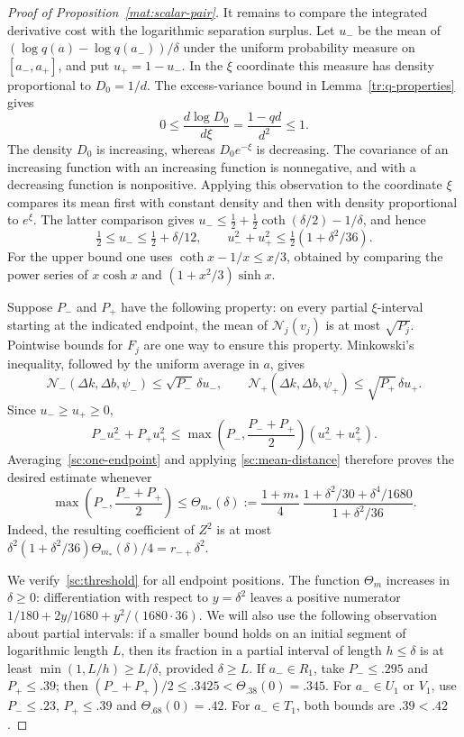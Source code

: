 \begin{proof}[Proof of Proposition~\ref{mat:scalar-pair}]
It remains to compare the integrated derivative cost with the logarithmic
separation surplus.  Let $u_-$ be the mean of
$(\log q(a)-\log q(a_-))/\delta$ under the uniform probability measure
on $[a_-,a_+]$, and put $u_+=1-u_-$.  In the $\xi$ coordinate this measure
has density proportional to $D_0=1/d$.  The excess-variance bound in
Lemma~\ref{tr:q-properties} gives
\[
 0\le \frac{d\log D_0}{d\xi}=\frac{1-qd}{d^2}\le1.
\]
The density $D_0$ is increasing, whereas $D_0e^{-\xi}$ is decreasing.
The covariance of an increasing function with an increasing function is
nonnegative, and with a decreasing function is nonpositive. Applying this
observation to the coordinate $\xi$ compares its mean first with constant
density and then with density proportional to $e^\xi$. The latter comparison
gives
$u_-\le\tfrac12+\tfrac12\coth(\delta/2)-1/\delta$, and hence
\begin{equation}\label{sc:mean-distance}
 \tfrac12\le u_-\le\tfrac12+\delta/12,
 \qquad u_-^2+u_+^2\le\tfrac12(1+\delta^2/36).
\end{equation}
For the upper bound one uses $\coth x-1/x\le x/3$, obtained by comparing
the power series of $x\cosh x$ and $(1+x^2/3)\sinh x$.

Suppose $P_-$ and $P_+$ have the following property: on every partial
$\xi$-interval starting at the indicated endpoint, the mean of
$\mathcal N_j(v_j)$ is at most $\sqrt{P_j}$.  Pointwise bounds for $F_j$
are one way to ensure this property.  Minkowski's inequality, followed by
the uniform average in $a$, gives
\[
 \mathcal N_-(\Delta k,\Delta b,\psi_-)\le\sqrt{P_-}\,\delta u_-,
 \qquad
 \mathcal N_+(\Delta k,\Delta b,\psi_+)\le\sqrt{P_+}\,\delta u_+.
\]
Since $u_-\ge u_+\ge0$,
\[
 P_-u_-^2+P_+u_+^2
 \le\max\left(P_-,\frac{P_-+P_+}{2}\right)(u_-^2+u_+^2).
\]
Averaging~\eqref{sc:one-endpoint} and applying
\eqref{sc:mean-distance} therefore proves the desired estimate whenever
\begin{equation}\label{sc:threshold}
 \max\left(P_-,\frac{P_-+P_+}{2}\right)\le
 \Theta_{m_*}(\delta):=
 \frac{1+m_*}{4}\,
 \frac{1+\delta^2/30+\delta^4/1680}{1+\delta^2/36}.
\end{equation}
Indeed, the resulting coefficient of $Z^2$ is at most
$\delta^2(1+\delta^2/36)\Theta_{m_*}(\delta)/4
=r_{-+}\delta^2$.

We verify~\eqref{sc:threshold} for all endpoint positions.  The function
$\Theta_m$ increases in $\delta\ge0$: differentiation with respect to
$y=\delta^2$ leaves a positive numerator
$1/180+2y/1680+y^2/(1680\cdot36)$.
We will also use the following observation about partial intervals:
if a smaller bound holds on an initial segment of logarithmic length $L$,
then its fraction in a partial interval of length $h\le\delta$ is at least
$\min(1,L/h)\ge L/\delta$, provided $\delta\ge L$.
If $a_-\in R_1$, take $P_-\le.295$ and $P_+\le.39$;
then $(P_-+P_+)/2\le.3425<\Theta_{.38}(0)=.345$.
For $a_-\in U_1$ or $V_1$, use $P_-\le.23$, $P_+\le.39$ and
$\Theta_{.68}(0)=.42$.  For $a_-\in T_1$, both bounds are $.39<.42$.


\end{proof}
